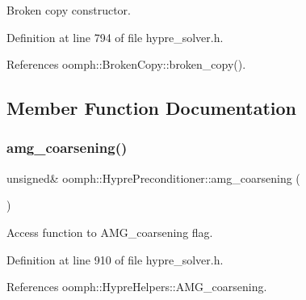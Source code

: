 Broken copy constructor. 



Definition at line 794 of file hypre\+\_\+solver.\+h.



References oomph\+::\+Broken\+Copy\+::broken\+\_\+copy().



\subsection{Member Function Documentation}
\mbox{\label{classoomph_1_1HyprePreconditioner_ab830e0c945d5318c660cf0e2e2c9bc70}} 
\subsubsection{\texorpdfstring{amg\+\_\+coarsening()}{amg\_coarsening()}}
{\footnotesize\ttfamily unsigned\& oomph\+::\+Hypre\+Preconditioner\+::amg\+\_\+coarsening (\begin{DoxyParamCaption}{ }\end{DoxyParamCaption})\hspace{0.3cm}{\ttfamily [inline]}}



Access function to A\+M\+G\+\_\+coarsening flag. 



Definition at line 910 of file hypre\+\_\+solver.\+h.



References oomph\+::\+Hypre\+Helpers\+::\+A\+M\+G\+\_\+coarsening.



